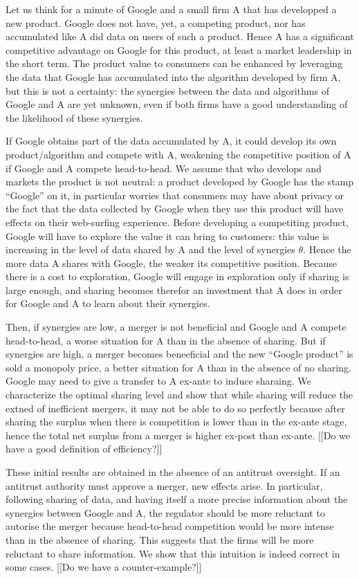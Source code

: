 \documentclass[a4paper,leqno]{article}%
\renewcommand{\t}{\theta}
\begin{document}
Let us think for a minute of Google and a small firm A that has developped a new product. Google does not have, yet, a competing product, nor has accumulated like A did data on users of such a product. Hence A has a significant competitive advantage on Google for this product, at least a market leadership in the short term. The product value to consumers can be enhanced by leveraging the data that Google has accumulated into the algorithm developed by firm A, but this is not a certainty: the synergies between the data and algorithms of Google and A are yet unknown, even if both firms have a good understanding of the likelihood of these synergies. 

If Google obtains part of the data accumulated by A, it could develop its own product/algorithm and compete with A, weakening the competitive position of A if Google and A compete head-to-head. We assume that who develops and markets the product is not neutral: a product developed by Google has the stamp ``Google'' on it, in particular worries that consumers may have about privacy or the fact that the data collected by Google when they use this product will have effects on their web-surfing experience. Before developing a competiting product, Google will have to explore the value it can bring to customers: this value is increasing in the level of data shared by A and the level of synergies $\t$. Hence the more data A shares with Google, the weaker its competitive position. Because there is a cost to exploration, Google will engage in exploration only if sharing is large enough, and sharing becomes therefor an investment that A does in order for Google and A to learn about their synergies.

Then, if synergies are low, a merger is not beneficial and Google and A compete head-to-head, a worse situation for A than in the absence of sharing. But if synergies are high, a merger becomes beneeficial and the new ``Google product'' is sold a monopoly price, a better situation for A than in the absence of no sharing. Google may need to give a transfer to A ex-ante to induce sharaing. We characterize the optimal sharing level and show that while sharing will reduce the extned of inefficient mergers, it may not be able to do so perfectly because after sharing the surplus when there is competition is lower than in the ex-ante stage, hence the total net surplus from a merger is higher ex-post than ex-ante. [[Do we have a good definition of efficiency?]]

These initial results are obtained in the absence of an antitrust oversight. If an antitrust authority must approve a merger, new effects arise. In particular, following sharing of data, and having itself a more precise information about the synergies between Google and A, the regulator should be more reluctant to autorise the merger because head-to-head competition would be more intense than in the absence of sharing. This suggests that the firms will be more reluctant to share information. We show that this intuition is indeed correct in some cases. [[Do we have a counter-example?]]
\end{document}
